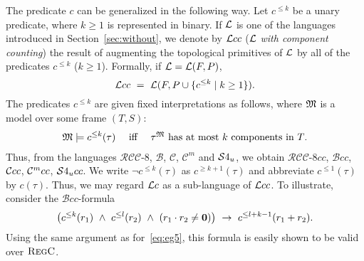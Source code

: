 \documentclass{LMCS}
\theoremstyle{plain}
\newcommand{\cB}{\ensuremath{\mathcal{B}}}\newcommand{\cBc}{\ensuremath{\mathcal{B}c}}\newcommand{\cBcc}{\ensuremath{\mathcal{B}cc}}
\newcommand{\cBC}{\ensuremath{\mathcal{C}}}
\newcommand{\RCCE}{\ensuremath{\mathcal{RCC}\text{-}8}}\newcommand{\RCCEcc}{\ensuremath{\RCCE{}cc}}\newcommand{\RCCEc}{\ensuremath{\RCCE{}c}}
\newcommand{\Regc}{\textsc{RegC}}
\newcommand{\Res}{{S}}\newcommand{\RegC}{\textsc{RC}}
\begin{document}
The predicate $c$ can be generalized in the following way. Let
$c^{\leq k}$ be a unary predicate, where $k \geq 1$ is represented in
binary. If $\mathcal{L}$ is one of the languages introduced in
Section~\ref{sec:without}, we denote by $\mathcal{L}cc$ ($\mathcal{L}$ \emph{with
  component counting}) the result of augmenting the topological
primitives of $\mathcal{L}$ by all of the predicates $c^{\leq k}$ ($k \geq
1$).  Formally, if $\mathcal{L} = \mathcal{L}(F,P)$,
\begin{equation*}
\mathcal{L}cc ~=~ \mathcal{L}(F, P \cup \{c^{\leq k} \mid k \geq 1 \}).
\end{equation*}
The predicates $c^{\leq k}$ are given fixed interpretations as
follows, where $\mathfrak{M}$ is a model over some frame $(T, \Res)$:
\begin{eqnarray*}
   \mathfrak{M} \models c^{\leq k}(\tau)\quad \mbox{ iff \quad  $\tau^{\mathfrak{M}}$ has at most $k$
   components in $T$}.
\end{eqnarray*}
Thus, from the languages $\RCCE$, $\cB$, $\cBC$, $\cBC^m$ and $\mathcal{S}4_u$, we obtain
$\RCCEcc$, $\cBcc$, $\cBCcc$, $\mathcal{C}^m{}cc$, $\mathcal{S}4_u{}cc$. We write $\neg c^{\leq k}(\tau)$
as $c^{\geq k+1}(\tau)$ and abbreviate $c^{\leq 1}(\tau)$ by
$c(\tau)$. Thus, we may regard $\mathcal{L}c$ as a sub-language of $\mathcal{L}cc$.
To illustrate, consider the $\cBcc$-formula
\begin{equation}\label{eq:eg6}
\big ( c^{\leq k}(r_1) \ \wedge \ c^{\leq l}(r_2) \ \wedge \ (r_1 \cdot r_2 \ne \mathbf{0}) \big ) \ \rightarrow \
      c^{\leq l+k-1}(r_1+r_2).
\end{equation}
Using the same argument as for~\eqref{eq:eg5}, this formula is
easily shown to be valid over $\Regc$.
\end{document}
